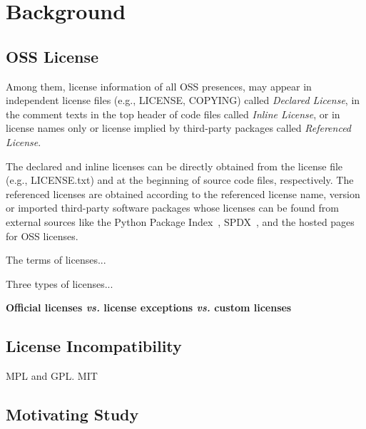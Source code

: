 \section{Background}\label{sec:background}
\subsection{OSS License}
Among them, license information of all OSS presences, may appear in independent license files (e.g., LICENSE, COPYING) called \textit{Declared License}, in the comment texts in the top header of code files called \textit{Inline License}, or in license names only or license implied by third-party packages called \textit{Referenced License}.  

The declared and inline licenses can be directly obtained from the license file (e.g., LICENSE.txt) and at the beginning of source code files, respectively. The referenced licenses are obtained according to the referenced license name, version or imported third-party software packages whose licenses can be found from external sources like the Python Package Index~\cite{url-pypi}, SPDX~\cite{mancinelli2006managing,url-spdx-licenses}, and the hosted pages for OSS licenses.


The terms of licenses...

Three types of licenses...

\noindent \textbf{Official licenses \textit{vs.} license exceptions \textit{vs.} custom licenses}




\subsection{License Incompatibility}
MPL and GPL.
MIT


\subsection{Motivating Study}